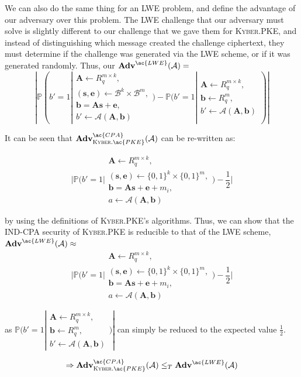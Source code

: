 \documentclass[a4paper, 10pt]{article}
\theoremstyle{definition}
\begin{document}
We can also do the same thing for an \ac{LWE} problem, and define the advantage of our adversary over this problem. The \ac{LWE} challenge that our adversary must solve is slightly different to our challenge that we gave them for \textsc{Kyber}.\ac{PKE}, and instead of distinguishing which message created the challenge ciphertext, they must determine if the challenge was generated via the \ac{LWE} scheme, or if it was generated randomly. Thus, our $\mathbf{Adv}^{\ac{LWE}}(\mathcal{A})=$
\[ |\mathbb{P}(b'=1|\substack{\mathbf{A}\leftarrow R^{m\times k}_q,\\ (\mathbf{s, e}) \leftarrow \mathcal{B}^k \times \mathcal{B}^m,\\ \mathbf{b} = \mathbf{As+e},\\ b'\leftarrow \mathcal{A}(\mathbf{A,b})}) - \mathbb{P}(b'=1|\substack{\mathbf{A}\leftarrow R^{m\times k}_q ,\\\mathbf{b}\leftarrow R^m_q,\\ b'\leftarrow \mathcal{A}(\mathbf{A,b})})| \]

It can be seen that $\mathbf{Adv}^{\ac{CPA}}_{\textsc{Kyber}.\ac{PKE}}(\mathcal{A})$ can be re-written as:

\[ |\mathbb{P}(b'=1|\substack{\mathbf{A} \leftarrow R^{m\times k}_q ,\\ (\mathbf{s, e}) \leftarrow \{0, 1\}^k \times \{0,1\}^m ,\\ \mathbf{b} = \mathbf{As} + \mathbf{e} + m_i ,\\ a \leftarrow \mathcal{A}(\mathbf{A,b})}) - \frac{1}{2}| \]

by using the definitions of \textsc{Kyber}.\ac{PKE}'s algorithms. Thus, we can show that the \ac{IND}-\ac{CPA} security of \textsc{Kyber}.\ac{PKE} is reducible to that of the \ac{LWE} scheme, $\mathbf{Adv}^{\ac{LWE}}(\mathcal{A})\approx $
\[ |\mathbb{P}(b'=1|\substack{\mathbf{A} \leftarrow R^{m\times k}_q ,\\ (\mathbf{s, e}) \leftarrow \{0, 1\}^k \times \{0,1\}^m ,\\ \mathbf{b} = \mathbf{As} + \mathbf{e} + m_i ,\\ a \leftarrow \mathcal{A}(\mathbf{A,b})}) - \frac{1}{2}| \]

as $\mathbb{P}(b'=1|\substack{\mathbf{A}\leftarrow R^{m\times k}_q ,\\\mathbf{b}\leftarrow R^m_q,\\ b'\leftarrow \mathcal{A}(\mathbf{A,b})})|$ can simply be reduced to the expected value $\frac{1}{2}$.

\[ \Rightarrow \mathbf{Adv}^{\ac{CPA}}_{\textsc{Kyber}.\ac{PKE}}(\mathcal{A}) \leq_T \mathbf{Adv}^{\ac{LWE}}(\mathcal{A}) \]
\end{document}
